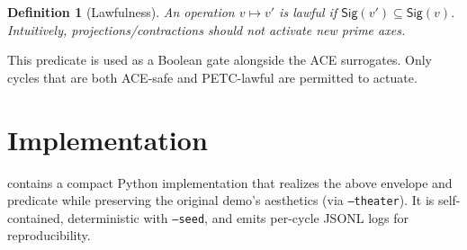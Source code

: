 \documentclass[11pt]{article}
\newtheorem{definition}{Definition}
\begin{document}
\begin{definition}[Lawfulness]
An operation $v\mapsto v'$ is \emph{lawful} if $\mathsf{Sig}(v')\subseteq \mathsf{Sig}(v)$. Intuitively, projections/contractions should not activate \emph{new} prime axes.
\end{definition}

This predicate is used as a Boolean gate alongside the ACE surrogates. Only cycles that are both ACE-safe and PETC-lawful are permitted to actuate.

\section{Implementation}
\label{sec:impl}
 contains a compact Python implementation that realizes the above envelope and predicate while preserving the original demo's aesthetics (via \texttt{--theater}). It is self-contained, deterministic with \texttt{--seed}, and emits per-cycle JSONL logs for reproducibility.
\end{document}

